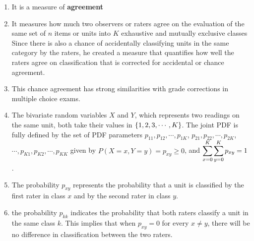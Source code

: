 \begin{enumerate}
    \item It is a measure of \textbf{agreement}
    \hfill \cite{statistics/book/Statistics-for-Data-Scientists/Maurits-Kaptein}

    \item It measures how much two observers or raters agree on the evaluation of the same set of $n$ items or units into $K$ exhaustive and mutually exclusive classes
    Since there is also a chance of accidentally classifying units in the same category by the raters, he created a measure that quantifies how well the raters agree on classification that is corrected for accidental or chance agreement. 
    \hfill \cite{statistics/book/Statistics-for-Data-Scientists/Maurits-Kaptein}

    \item This chance agreement has strong similarities with grade corrections in multiple choice exams.
    \hfill \cite{statistics/book/Statistics-for-Data-Scientists/Maurits-Kaptein}

    \item The bivariate random variables $X$ and $Y$, which represents two readings on the same unit, both take their values in $\left\{1, 2, 3, \cdots , K \right\}$. 
    The joint PDF is fully defined by the set of PDF parameters $p_{11}, p_{12}, \cdots , p_{1K}$, $p_{21}, p_{22}, \cdots , p_{2K}$, $\cdots , p_{K 1}, p_{K 2}, \cdots , p_{K K}$ given by $P(X = x, Y = y) = p_{x y} \geq 0$, and $\displaystyle\sum^K_{x=0} \displaystyle\sum^K_{y=0} p_{x y} = 1$.
    \hfill \cite{statistics/book/Statistics-for-Data-Scientists/Maurits-Kaptein}

    \item The probability $p_{x y}$ represents the probability that a unit is classified by the first rater in class $x$ and by the second rater in class $y$. 
    \hfill \cite{statistics/book/Statistics-for-Data-Scientists/Maurits-Kaptein}

    \item the probability $p_{kk}$ indicates the probability that both raters classify a unit in the same class $k$. 
    This implies that when $p_{x y} = 0$ for every $x \neq y$, there will be no difference in classification between the two raters.
    \hfill \cite{statistics/book/Statistics-for-Data-Scientists/Maurits-Kaptein}

    
\end{enumerate}




























